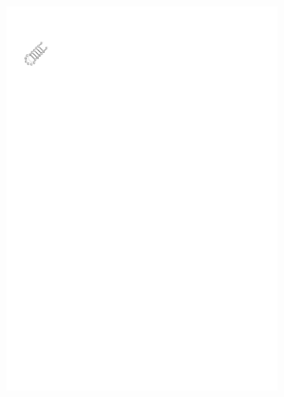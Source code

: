 \begin{figure}
  \begin{subfigure}{\wi}
    \includegraphics[trim=1cm 24.5cm 17.5cm 2.5cm]{../img/alg/insert/1/circle-small-begin}
  \end{subfigure}
  \begin{subfigure}{\wi}

\end{subfigure}
\end{figure}
